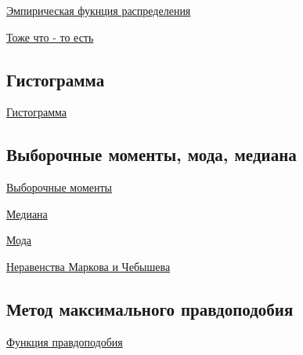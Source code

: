 \documentclass{article}
\begin{document}
\href{https://ru.wikipedia.org/wiki/%D0%92%D1%8B%D0%B1%D0%BE%D1%80%D0%BE%D1%87%D0%BD%D0%B0%D1%8F_%D1%84%D1%83%D0%BD%D0%BA%D1%86%D0%B8%D1%8F_%D1%80%D0%B0%D1%81%D0%BF%D1%80%D0%B5%D0%B4%D0%B5%D0%BB%D0%B5%D0%BD%D0%B8%D1%8F}{Эмпирическая фукнция распределения}

\href{https://tvims.nsu.ru/chernova/ms/lec/node4.html}{Тоже что - то есть}

\subsection{Гистограмма}

\href{https://ru.wikipedia.org/wiki/%D0%93%D0%B8%D1%81%D1%82%D0%BE%D0%B3%D1%80%D0%B0%D0%BC%D0%BC%D0%B0_(%D1%81%D1%82%D0%B0%D1%82%D0%B8%D1%81%D1%82%D0%B8%D0%BA%D0%B0)}{Гистограмма}

\subsection{Выборочные моменты, мода, медиана}

\href{https://ru.wikipedia.org/wiki/%D0%92%D1%8B%D0%B1%D0%BE%D1%80%D0%BE%D1%87%D0%BD%D1%8B%D0%B5_%D0%BC%D0%BE%D0%BC%D0%B5%D0%BD%D1%82%D1%8B}{Выборочные моменты}

\href{https://ru.wikipedia.org/wiki/%D0%9C%D0%B5%D0%B4%D0%B8%D0%B0%D0%BD%D0%B0_(%D1%81%D1%82%D0%B0%D1%82%D0%B8%D1%81%D1%82%D0%B8%D0%BA%D0%B0)}{Медиана}

\href{https://ru.wikipedia.org/wiki/%D0%9C%D0%BE%D0%B4%D0%B0_(%D1%81%D1%82%D0%B0%D1%82%D0%B8%D1%81%D1%82%D0%B8%D0%BA%D0%B0)}{Мода}

\href{https://neerc.ifmo.ru/wiki/index.php?title=%D0%9D%D0%B5%D1%80%D0%B0%D0%B2%D0%B5%D0%BD%D1%81%D1%82%D0%B2%D0%BE_%D0%9C%D0%B0%D1%80%D0%BA%D0%BE%D0%B2%D0%B0#:~:text=%D0%9D%D0%B5%D1%80%D0%B0%D0%B2%D0%B5%D0%BD%D1%81%D1%82%D0%B2%D0%BE%20%D0%A7%D0%B5%D0%B1%D1%8B%D1%88%D0%B5%D0%B2%D0%B0%20(%D0%B0%D0%BD%D0%B3%D0%BB.,%D0%B1%D0%BB%D0%B8%D0%B7%D0%BA%D0%B8%D0%B5%20%D0%BA%20%D0%B7%D0%BD%D0%B0%D1%87%D0%B5%D0%BD%D0%B8%D1%8E%20%D0%BC%D0%B0%D1%82%D0%B5%D0%BC%D0%B0%D1%82%D0%B8%D1%87%D0%B5%D1%81%D0%BA%D0%BE%D0%B3%D0%BE%20%D0%BE%D0%B6%D0%B8%D0%B4%D0%B0%D0%BD%D0%B8%D1%8F}{Неравенства Маркова и Чебышева}

\subsection{Метод максимального правдоподобия}

\href{https://ru.wikipedia.org/wiki/%D0%A4%D1%83%D0%BD%D0%BA%D1%86%D0%B8%D1%8F_%D0%BF%D1%80%D0%B0%D0%B2%D0%B4%D0%BE%D0%BF%D0%BE%D0%B4%D0%BE%D0%B1%D0%B8%D1%8F}{Функция правдоподобия}
\end{document}
